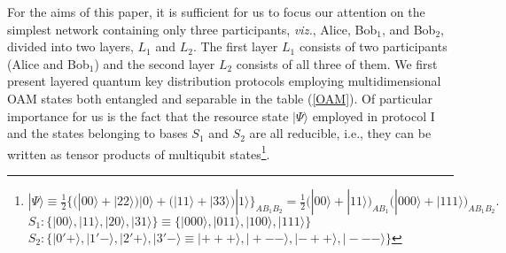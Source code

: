 \documentclass[fleqn,10pt]{wlscirep}
\begin{document}
For the aims of this paper, it is sufficient for us to focus our attention on the simplest network containing only three participants, {\it viz.}, Alice, Bob$_1$, and Bob$_2$, divided into two layers, $L_1$ and $L_2$. The first layer $L_1$ consists of two participants (Alice and Bob$_1$) and the second layer $L_2$ consists of all three of them. We first present layered quantum key distribution protocols employing multidimensional OAM states both entangled and separable in the table (\ref{OAM}). Of particular importance for us is the fact that the resource state $|\Psi\rangle$ employed in protocol I and the states belonging to bases $S_1$ and $S_2$ are all reducible, i.e., they can be written as tensor products of multiqubit states\footnote{$|\Psi\rangle\equiv\frac{1}{2}\Big\{\Big(|00\rangle+|22\rangle\Big)|0\rangle+\Big(|11\rangle+|33\rangle\Big)|1\rangle\Big\}_{AB_1B_2}=\frac{1}{2}\Big(|00\rangle+|11\rangle\Big)_{AB_1}\Big(|000\rangle+|111\rangle\Big)_{AB_1B_2}.$\\
$S_1: \{|00\rangle, |11\rangle, |20\rangle, |31\rangle\}\equiv \{|000\rangle, |011\rangle, |100\rangle, |111\rangle\}$\\
$S_2: \{|0'+\rangle, |1'-\rangle, |2'+\rangle, |3'-\rangle\equiv |+++\rangle, |+--\rangle, |-++\rangle, |---\rangle\}$}.
\end{document}
